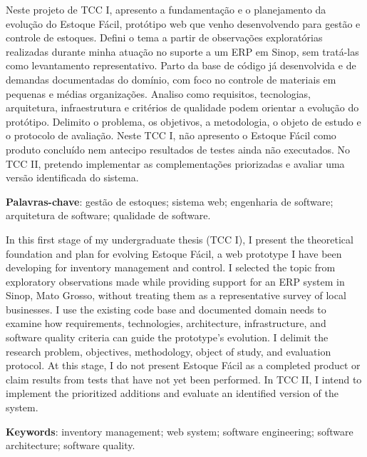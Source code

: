 \setlength{\absparsep}{18pt}
\begin{resumo}[Resumo]
Neste projeto de TCC I, apresento a fundamentação e o planejamento da evolução do Estoque Fácil, protótipo web que venho desenvolvendo para gestão e controle de estoques. Defini o tema a partir de observações exploratórias realizadas durante minha atuação no suporte a um ERP em Sinop, sem tratá-las como levantamento representativo. Parto da base de código já desenvolvida e de demandas documentadas do domínio, com foco no controle de materiais em pequenas e médias organizações. Analiso como requisitos, tecnologias, arquitetura, infraestrutura e critérios de qualidade podem orientar a evolução do protótipo. Delimito o problema, os objetivos, a metodologia, o objeto de estudo e o protocolo de avaliação. Neste TCC I, não apresento o Estoque Fácil como produto concluído nem antecipo resultados de testes ainda não executados. No TCC II, pretendo implementar as complementações priorizadas e avaliar uma versão identificada do sistema.

\textbf{Palavras-chave}: gestão de estoques; sistema web; engenharia de software; arquitetura de software; qualidade de software.
\end{resumo}

\begin{resumo}[Abstract]
In this first stage of my undergraduate thesis (TCC I), I present the theoretical foundation and plan for evolving Estoque Fácil, a web prototype I have been developing for inventory management and control. I selected the topic from exploratory observations made while providing support for an ERP system in Sinop, Mato Grosso, without treating them as a representative survey of local businesses. I use the existing code base and documented domain needs to examine how requirements, technologies, architecture, infrastructure, and software quality criteria can guide the prototype's evolution. I delimit the research problem, objectives, methodology, object of study, and evaluation protocol. At this stage, I do not present Estoque Fácil as a completed product or claim results from tests that have not yet been performed. In TCC II, I intend to implement the prioritized additions and evaluate an identified version of the system.

\textbf{Keywords}: inventory management; web system; software engineering; software architecture; software quality.
\end{resumo}

